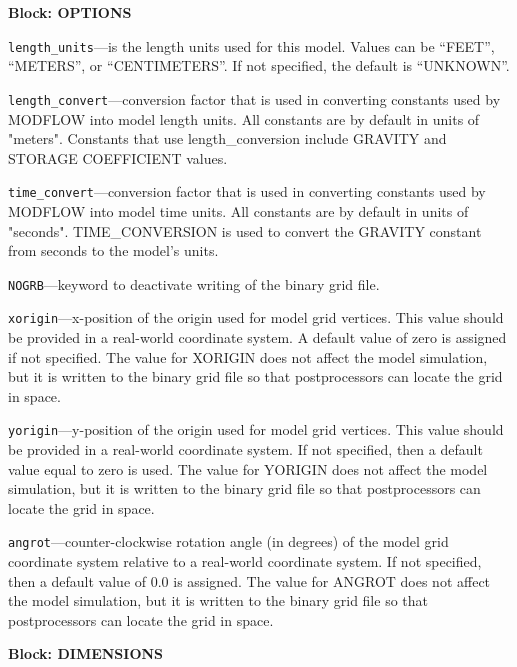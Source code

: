 
\item \textbf{Block: OPTIONS}

\begin{description}
\item \texttt{length\_units}---is the length units used for this model.  Values can be ``FEET'', ``METERS'', or ``CENTIMETERS''.  If not specified, the default is ``UNKNOWN''.

\item \texttt{length\_convert}---conversion factor that is used in converting constants used by MODFLOW into model length units.  All constants are by default in units of "meters". Constants that use length_conversion include GRAVITY and STORAGE COEFFICIENT values.

\item \texttt{time\_convert}---conversion factor that is used in converting constants used by MODFLOW into model time units.  All constants are by default in units of "seconds". TIME_CONVERSION is used to convert the GRAVITY constant from seconds to the model's units.

\item \texttt{NOGRB}---keyword to deactivate writing of the binary grid file.

\item \texttt{xorigin}---x-position of the origin used for model grid vertices.  This value should be provided in a real-world coordinate system.  A default value of zero is assigned if not specified.  The value for XORIGIN does not affect the model simulation, but it is written to the binary grid file so that postprocessors can locate the grid in space.

\item \texttt{yorigin}---y-position of the origin used for model grid vertices.  This value should be provided in a real-world coordinate system.  If not specified, then a default value equal to zero is used.  The value for YORIGIN does not affect the model simulation, but it is written to the binary grid file so that postprocessors can locate the grid in space.

\item \texttt{angrot}---counter-clockwise rotation angle (in degrees) of the model grid coordinate system relative to a real-world coordinate system.  If not specified, then a default value of 0.0 is assigned.  The value for ANGROT does not affect the model simulation, but it is written to the binary grid file so that postprocessors can locate the grid in space.

\end{description}
\item \textbf{Block: DIMENSIONS}

